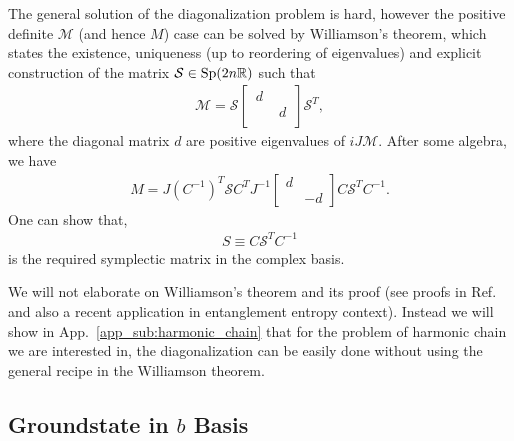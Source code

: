 The general solution of the diagonalization problem is hard\cite{arnold_mathematical_2010}, however the positive definite $\mathcal{M}$ (and hence $M$) case can be solved by Williamson's theorem\cite{arnold_mathematical_2010,xiao_theory_2009,pirandola_correlation_2009,gosson_symplectic_2006}, which states the existence, uniqueness (up to reordering of eigenvalues) and explicit construction of the matrix $\mathcal{S}\in {\rm Sp}(2n \mathbb{R}) $ such that 
\begin{equation}\begin{aligned}
\mathcal{M}=\mathcal{S}
\begin{bmatrix}
\, d \, & \\
 & \, d\, \\
\end{bmatrix}
\mathcal{S}^T,
\end{aligned}\end{equation}
where the diagonal matrix $d$ are positive eigenvalues of $iJ\mathcal{M}$. After some algebra, we have
\begin{equation}\begin{aligned}
\label{eq:diagonalization_M}
M=J(C^{-1})^T\mathcal{S}C^TJ^{-1}
\begin{bmatrix}
d\\
&-d
\end{bmatrix}
C\mathcal{S}^TC^{-1}.
\end{aligned}\end{equation}
One can show that,
\begin{equation*}\begin{aligned}
S\equiv C\mathcal{S}^TC^{-1}
\end{aligned}\end{equation*}
is the required symplectic matrix in the complex basis. 

We will not elaborate on Williamson's theorem and its proof (see proofs in Ref.~ and also a recent application in entanglement entropy context\cite{coser_contour_2017}). Instead we will show in App.~\ref{app_sub:harmonic_chain} that for the problem of harmonic chain we are interested in, the diagonalization can be easily done without using the general recipe in the Williamson theorem. 


\subsection{Groundstate in $b$ Basis}

